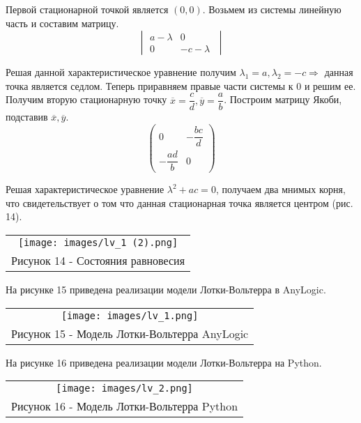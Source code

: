 Первой стационарной точкой является $(0,0)$. Возьмем из системы линейную часть и составим матрицу.
\begin{equation}
  \begin{vmatrix}
  a-\lambda&0\\0&-c-\lambda\;
\end{vmatrix}
\end{equation}

Решая данной характеристическое уравнение получим $\lambda_1=a, \lambda_2=-c\Rightarrow$ данная точка является седлом.
Теперь приравняем правые части системы к 0 и решим ее. Получим вторую стационарную точку $\overline{x}=\dfrac{c}{d},
\overline{y}=\dfrac{a}{b}$. Построим матрицу Якоби, подставив $\overline{x},\overline{y}$.
\begin{equation}
  \begin{pmatrix}
    0&-\dfrac{bc}{d}\\-\dfrac{ad}{b}&0
  \end{pmatrix}
\end{equation}

Решая характеристическое уравнение $\lambda^2+ac=0$, получаем два мнимых корня, что свидетельствует о том что данная
стационарная точка является центром (рис. 14).
\begin{center}
  \begin{tabular}{c}
    \texttt{[image: images/lv\_1 (2).png]}\\
    Рисунок 14 - Состояния равновесия
  \end{tabular}
\end{center}

На рисунке 15 приведена реализации модели Лотки-Вольтерра в AnyLogic.
\begin{center}
  \begin{tabular}{c}
    \texttt{[image: images/lv\_1.png]}\\
    Рисунок 15 - Модель Лотки-Вольтерра AnyLogic
  \end{tabular}
\end{center}

На рисунке 16 приведена реализации модели Лотки-Вольтерра на Python.
\begin{center}
  \begin{tabular}{c}
    \texttt{[image: images/lv\_2.png]}\\
    Рисунок 16 - Модель Лотки-Вольтерра Python
  \end{tabular}
\end{center}

